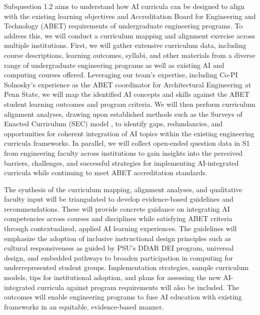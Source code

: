 \documentclass[11pt]{article}
\begin{document}
Subquestion 1.2 aims to understand how AI curricula can be designed to align with the existing learning objectives and Accreditation Board for Engineering and Technology (ABET) requirements of undergraduate engineering programs. 
To address this, we will conduct a curriculum mapping and alignment exercise across multiple institutions. First, we will gather extensive curriculum data, including course descriptions, learning outcomes, syllabi, and other materials from a diverse range of undergraduate engineering programs as well as existing AI and computing courses offered. Leveraging our team's expertise, including Co-PI Solnosky's experience as the ABET coordinator for Architectural Engineering at Penn State, we will map the identified AI concepts and skills against the ABET student learning outcomes and program criteria.
We will then perform curriculum alignment analyses, drawing upon established methods such as the Surveys of Enacted Curriculum (SEC) model \cite{blank2005surveys}, to identify gaps, redundancies, and opportunities for coherent integration of AI topics within the existing engineering curricula frameworks. 
In parallel, we will collect open-ended question data in S1 from engineering faculty across institutions to gain insights into the perceived barriers, challenges, and successful strategies for implementing AI-integrated curricula while continuing to meet ABET accreditation standards.

The synthesis of the curriculum mapping, alignment analyses, and qualitative faculty input will be triangulated to develop evidence-based guidelines and recommendations. These will provide concrete guidance on integrating AI competencies across courses and disciplines while satisfying ABET criteria through contextualized, applied AI learning experiences. The guidelines will emphasize the adoption of inclusive instructional design principles such as cultural responsiveness as guided by PSU's DDAR DEI program, universal design, and embedded pathways to broaden participation in computing for underrepresented student groups. 
Implementation strategies, sample curriculum models, tips for institutional adoption, and plans for assessing the new AI-integrated curricula against program requirements will also be included. 
The outcomes will enable engineering programs to fuse AI education with existing frameworks in an equitable, evidence-based manner.
\end{document}
